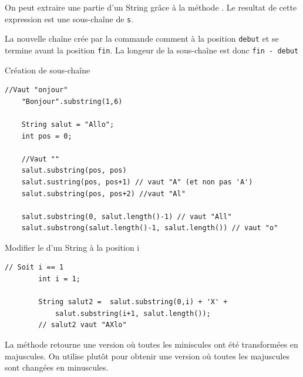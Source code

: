 \documentclass{report}
\begin{document}
\begin{note}
On peut extraire une partie d'un String grâce à la méthode 
. Le resultat de cette expression est une sous-chaîne de
\texttt{\footnotesize{s}}.
\end{note}

\begin{Remarque*}{}{}
La nouvelle chaîne crée par la commande
 comment à la position \texttt{\footnotesize{debut}} et se
termine avant la position \texttt{\footnotesize{fin}}.
La longeur de la sous-chaîne est donc \texttt{\footnotesize{fin - debut}}
\end{Remarque*}

\begin{EExample*}{Création de sous-chaîne}{}
\begin{lstlisting}[style=JavaDraculaWhite]
	//Vaut "onjour"
	"Bonjour".substring(1,6)

	String salut = "Allo";
	int pos = 0;

    //Vaut ""
	salut.substring(pos, pos) 
	salut.sustring(pos, pos+1) // vaut "A" (et non pas 'A')
	salut.substring(pos, pos+2) //vaut "Al"

	salut.substring(0, salut.length()-1) // vaut "All"
	salut.substrong(salut.length()-1, salut.length()) // vaut "o"
\end{lstlisting}
\end{EExample*}


\begin{EExample*}{Modifier le  d'un String à la position i}{}
	\begin{lstlisting}[style=JavaDraculaWhite]
		// Soit i == 1
		int i = 1;

		String salut2 =  salut.substring(0,i) + 'X' +
		    salut.substring(i+1, salut.length());
		// salut2 vaut "AXlo"
	\end{lstlisting}
\end{EExample*}

\begin{note}
La méthode  retourne une version où toutes les miniscules ont été 
transformées en majuscules. On utilise plutôt  pour obtenir une
version où toutes les majuscules sont changées en minuscules. 

\end{note}
\end{document}
